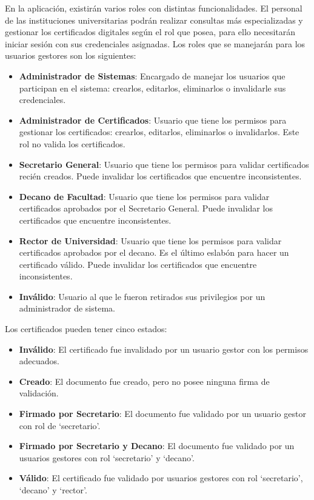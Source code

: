 En la aplicación, existirán varios roles con distintas funcionalidades. El personal de las instituciones universitarias podrán realizar consultas más especializadas y gestionar los certificados digitales según el rol que posea, para ello necesitarán iniciar sesión con sus credenciales asignadas. Los roles que se manejarán para los usuarios gestores son los siguientes:

\begin{itemize}
\item \textbf{Administrador de Sistemas}: Encargado de manejar los usuarios que participan en el sistema: crearlos, editarlos, eliminarlos o invalidarle sus credenciales.
\item \textbf{Administrador de Certificados}: Usuario que tiene los permisos para gestionar los certificados: crearlos, editarlos, eliminarlos o invalidarlos. Este rol no valida los certificados.
\item \textbf{Secretario General}: Usuario que tiene los permisos para validar certificados recién creados. Puede invalidar los certificados que encuentre inconsistentes.
\item \textbf{Decano de Facultad}: Usuario que tiene los permisos para validar certificados aprobados por el Secretario General. Puede invalidar los certificados que encuentre inconsistentes.
\item \textbf{Rector de Universidad}: Usuario que tiene los permisos para validar certificados aprobados por el decano. Es el último eslabón para hacer un certificado válido. Puede invalidar los certificados que encuentre inconsistentes.
\item \textbf{Inválido}: Usuario al que le fueron retirados sus privilegios por un administrador de sistema.
\end{itemize}

Los certificados pueden tener cinco estados:
\begin{itemize}
\item \textbf{Inválido}: El certificado fue invalidado por un usuario gestor con los permisos adecuados.
\item \textbf{Creado}: El documento fue creado, pero no posee ninguna firma de validación.
\item \textbf{Firmado por Secretario}: El documento fue validado por un usuario gestor con rol de `secretario'.
\item \textbf{Firmado por Secretario y Decano}: El documento fue validado por un usuarios gestores con rol `secretario' y `decano'.
\item \textbf{Válido}: El certificado fue validado por usuarios gestores con rol `secretario', `decano' y `rector'.
\end{itemize}

